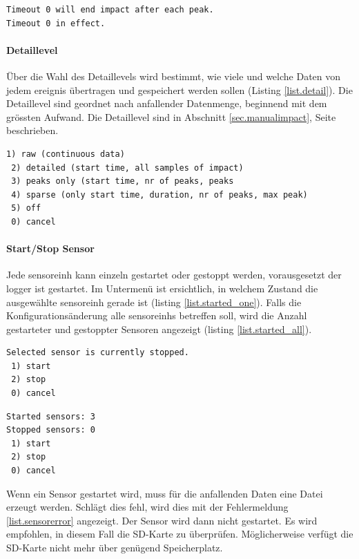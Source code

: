 \begin{lstlisting}[caption=Warnung kurzer Timeout, label=list.paramtimeoutshort]
Timeout 0 will end impact after each peak.
Timeout 0 in effect.
\end{lstlisting}

\paragraph{Detaillevel} Über die Wahl des Detaillevels wird bestimmt, wie viele und welche Daten von jedem \gls{ereignis} übertragen und gespeichert werden sollen (Listing \ref{list.detail}). Die Detaillevel sind geordnet nach anfallender Datenmenge, beginnend mit dem grössten Aufwand. Die Detaillevel sind in Abschnitt \ref{sec.manualimpact}, Seite \pageref{sec.manualimpact} beschrieben.

\begin{lstlisting}[caption=Untermenü Detail-Level, label=list.detail]
 1) raw (continuous data)
 2) detailed (start time, all samples of impact)
 3) peaks only (start time, nr of peaks, peaks
 4) sparse (only start time, duration, nr of peaks, max peak)
 5) off
 0) cancel
\end{lstlisting}

\paragraph{Start/Stop Sensor} Jede \gls{sensoreinh} kann einzeln gestartet oder gestoppt werden, vorausgesetzt der \gls{logger} ist gestartet. Im Untermenü ist ersichtlich, in welchem Zustand die ausgewählte \gls{sensoreinh} gerade ist (listing \ref{list.started_one}). Falls die Konfigurationsänderung alle \glspl{sensoreinh} betreffen soll, wird die Anzahl gestarteter und gestoppter Sensoren angezeigt (listing \ref{list.started_all}).

\begin{lstlisting}[caption=Untermenü Start/Stop einzeln, label=list.started_one]
Selected sensor is currently stopped.
 1) start
 2) stop
 0) cancel
\end{lstlisting}

\begin{lstlisting}[caption=Untermenü Start/Stop alle Sensoren, label=list.started_all]
Started sensors: 3
Stopped sensors: 0
 1) start
 2) stop
 0) cancel
\end{lstlisting}

Wenn ein Sensor gestartet wird, muss für die anfallenden Daten eine Datei erzeugt werden. Schlägt dies fehl, wird dies mit der Fehlermeldung \ref{list.sensorerror} angezeigt. Der Sensor wird dann nicht gestartet. Es wird empfohlen, in diesem Fall die SD-Karte zu überprüfen. Möglicherweise verfügt die SD-Karte nicht mehr über genügend Speicherplatz.

